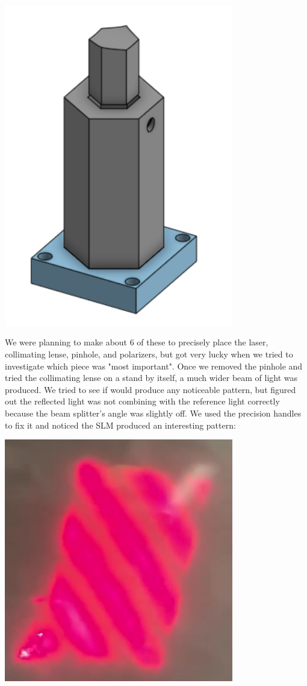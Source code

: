 \documentclass[12pt]{article}
\begin{document}
\begin{center}
\includegraphics[width=100mm]{holder.png}
\end{center}

We were planning to make about 6 of these to precisely place the laser, collimating lense, pinhole, and polarizers, but got very lucky when we tried to investigate which piece was "most important". Once we removed the pinhole and tried the collimating lense on a stand by itself, a much wider beam of light was produced. We tried to see if would produce any noticeable pattern, but figured out the reflected light was not combining with the reference light correctly because the beam splitter's angle was slightly off. We used the precision handles to fix it and noticed the SLM produced an interesting pattern:

\begin{center}
\includegraphics[width=100mm]{initHologram.png}
\end{center}
\end{document}
